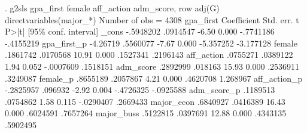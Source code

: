 . g2sls gpa_first female aff_action adm_score, row adj(G) directvariables(major_*)
{\smallskip}
                                                  Number of obs =       4308
   gpa_first {\VBAR} Coefficient  Std. err.      t    P>|t|     [95\% conf. interval]
       _cons {\VBAR}  -.5948202   .0914547    -6.50   0.000    -.7741186   -.4155219
 gpa_first_p {\VBAR}   -4.26719   .5560077    -7.67   0.000    -5.357252   -3.177128
      female {\VBAR}   .1861742   .0170568    10.91   0.000     .1527341    .2196143
  aff_action {\VBAR}   .0755271   .0389122     1.94   0.052    -.0007609    .1518151
   adm_score {\VBAR}   .2892999    .018163    15.93   0.000     .2536911    .3249087
    female_p {\VBAR}   .8655189   .2057867     4.21   0.000     .4620708    1.268967
aff_action_p {\VBAR}  -.2825957    .096932    -2.92   0.004    -.4726325   -.0925588
 adm_score_p {\VBAR}   .1189513   .0754862     1.58   0.115    -.0290407    .2669433
  major_econ {\VBAR}   .6840927   .0416389    16.43   0.000     .6024591    .7657264
  major_buss {\VBAR}   .5122815   .0397691    12.88   0.000     .4343135    .5902495

